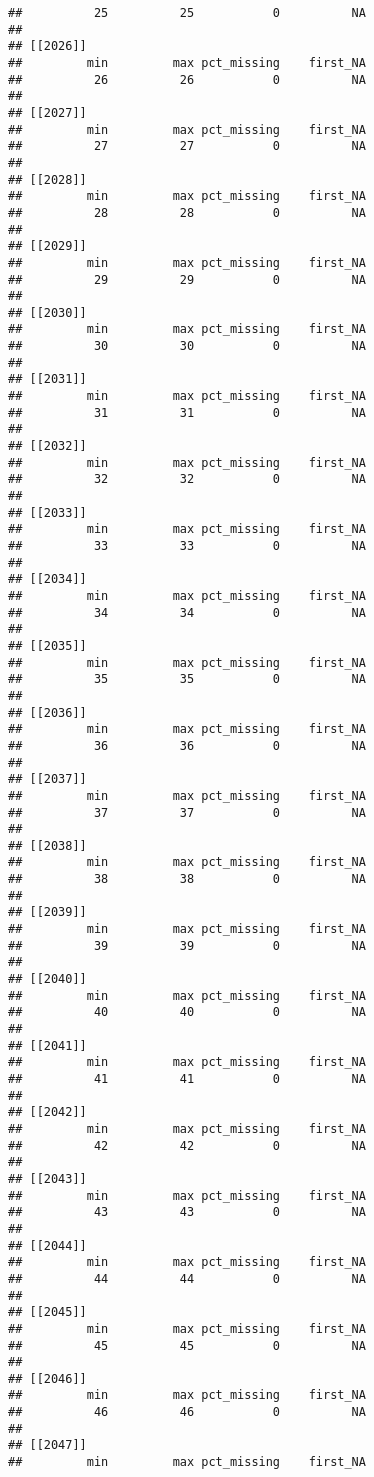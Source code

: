 \documentclass[
]{article}
\begin{document}
\begin{verbatim}
##          25          25           0          NA 
## 
## [[2026]]
##         min         max pct_missing    first_NA 
##          26          26           0          NA 
## 
## [[2027]]
##         min         max pct_missing    first_NA 
##          27          27           0          NA 
## 
## [[2028]]
##         min         max pct_missing    first_NA 
##          28          28           0          NA 
## 
## [[2029]]
##         min         max pct_missing    first_NA 
##          29          29           0          NA 
## 
## [[2030]]
##         min         max pct_missing    first_NA 
##          30          30           0          NA 
## 
## [[2031]]
##         min         max pct_missing    first_NA 
##          31          31           0          NA 
## 
## [[2032]]
##         min         max pct_missing    first_NA 
##          32          32           0          NA 
## 
## [[2033]]
##         min         max pct_missing    first_NA 
##          33          33           0          NA 
## 
## [[2034]]
##         min         max pct_missing    first_NA 
##          34          34           0          NA 
## 
## [[2035]]
##         min         max pct_missing    first_NA 
##          35          35           0          NA 
## 
## [[2036]]
##         min         max pct_missing    first_NA 
##          36          36           0          NA 
## 
## [[2037]]
##         min         max pct_missing    first_NA 
##          37          37           0          NA 
## 
## [[2038]]
##         min         max pct_missing    first_NA 
##          38          38           0          NA 
## 
## [[2039]]
##         min         max pct_missing    first_NA 
##          39          39           0          NA 
## 
## [[2040]]
##         min         max pct_missing    first_NA 
##          40          40           0          NA 
## 
## [[2041]]
##         min         max pct_missing    first_NA 
##          41          41           0          NA 
## 
## [[2042]]
##         min         max pct_missing    first_NA 
##          42          42           0          NA 
## 
## [[2043]]
##         min         max pct_missing    first_NA 
##          43          43           0          NA 
## 
## [[2044]]
##         min         max pct_missing    first_NA 
##          44          44           0          NA 
## 
## [[2045]]
##         min         max pct_missing    first_NA 
##          45          45           0          NA 
## 
## [[2046]]
##         min         max pct_missing    first_NA 
##          46          46           0          NA 
## 
## [[2047]]
##         min         max pct_missing    first_NA 

\end{verbatim}
\end{document}
